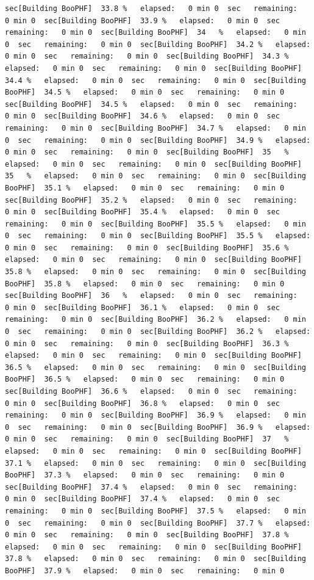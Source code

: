 \documentclass[
]{book}
\begin{document}
\begin{verbatim}
sec[Building BooPHF]  33.8 %   elapsed:   0 min 0  sec   remaining:   0 min 0  sec[Building BooPHF]  33.9 %   elapsed:   0 min 0  sec   remaining:   0 min 0  sec[Building BooPHF]  34   %   elapsed:   0 min 0  sec   remaining:   0 min 0  sec[Building BooPHF]  34.2 %   elapsed:   0 min 0  sec   remaining:   0 min 0  sec[Building BooPHF]  34.3 %   elapsed:   0 min 0  sec   remaining:   0 min 0  sec[Building BooPHF]  34.4 %   elapsed:   0 min 0  sec   remaining:   0 min 0  sec[Building BooPHF]  34.5 %   elapsed:   0 min 0  sec   remaining:   0 min 0  sec[Building BooPHF]  34.5 %   elapsed:   0 min 0  sec   remaining:   0 min 0  sec[Building BooPHF]  34.6 %   elapsed:   0 min 0  sec   remaining:   0 min 0  sec[Building BooPHF]  34.7 %   elapsed:   0 min 0  sec   remaining:   0 min 0  sec[Building BooPHF]  34.9 %   elapsed:   0 min 0  sec   remaining:   0 min 0  sec[Building BooPHF]  35   %   elapsed:   0 min 0  sec   remaining:   0 min 0  sec[Building BooPHF]  35   %   elapsed:   0 min 0  sec   remaining:   0 min 0  sec[Building BooPHF]  35.1 %   elapsed:   0 min 0  sec   remaining:   0 min 0  sec[Building BooPHF]  35.2 %   elapsed:   0 min 0  sec   remaining:   0 min 0  sec[Building BooPHF]  35.4 %   elapsed:   0 min 0  sec   remaining:   0 min 0  sec[Building BooPHF]  35.5 %   elapsed:   0 min 0  sec   remaining:   0 min 0  sec[Building BooPHF]  35.5 %   elapsed:   0 min 0  sec   remaining:   0 min 0  sec[Building BooPHF]  35.6 %   elapsed:   0 min 0  sec   remaining:   0 min 0  sec[Building BooPHF]  35.8 %   elapsed:   0 min 0  sec   remaining:   0 min 0  sec[Building BooPHF]  35.8 %   elapsed:   0 min 0  sec   remaining:   0 min 0  sec[Building BooPHF]  36   %   elapsed:   0 min 0  sec   remaining:   0 min 0  sec[Building BooPHF]  36.1 %   elapsed:   0 min 0  sec   remaining:   0 min 0  sec[Building BooPHF]  36.2 %   elapsed:   0 min 0  sec   remaining:   0 min 0  sec[Building BooPHF]  36.2 %   elapsed:   0 min 0  sec   remaining:   0 min 0  sec[Building BooPHF]  36.3 %   elapsed:   0 min 0  sec   remaining:   0 min 0  sec[Building BooPHF]  36.5 %   elapsed:   0 min 0  sec   remaining:   0 min 0  sec[Building BooPHF]  36.5 %   elapsed:   0 min 0  sec   remaining:   0 min 0  sec[Building BooPHF]  36.6 %   elapsed:   0 min 0  sec   remaining:   0 min 0  sec[Building BooPHF]  36.8 %   elapsed:   0 min 0  sec   remaining:   0 min 0  sec[Building BooPHF]  36.9 %   elapsed:   0 min 0  sec   remaining:   0 min 0  sec[Building BooPHF]  36.9 %   elapsed:   0 min 0  sec   remaining:   0 min 0  sec[Building BooPHF]  37   %   elapsed:   0 min 0  sec   remaining:   0 min 0  sec[Building BooPHF]  37.1 %   elapsed:   0 min 0  sec   remaining:   0 min 0  sec[Building BooPHF]  37.3 %   elapsed:   0 min 0  sec   remaining:   0 min 0  sec[Building BooPHF]  37.4 %   elapsed:   0 min 0  sec   remaining:   0 min 0  sec[Building BooPHF]  37.4 %   elapsed:   0 min 0  sec   remaining:   0 min 0  sec[Building BooPHF]  37.5 %   elapsed:   0 min 0  sec   remaining:   0 min 0  sec[Building BooPHF]  37.7 %   elapsed:   0 min 0  sec   remaining:   0 min 0  sec[Building BooPHF]  37.8 %   elapsed:   0 min 0  sec   remaining:   0 min 0  sec[Building BooPHF]  37.8 %   elapsed:   0 min 0  sec   remaining:   0 min 0  sec[Building BooPHF]  37.9 %   elapsed:   0 min 0  sec   remaining:   0 min 0  
\end{verbatim}
\end{document}
